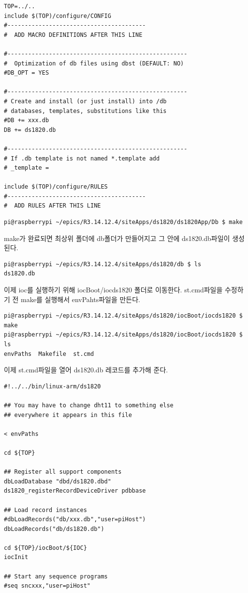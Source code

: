 \documentclass[11pt
  , a4paper
  , article
  , oneside
]{memoir}
\begin{document}
\begin{lstlisting}[style=termstyle]
TOP=../..
include $(TOP)/configure/CONFIG
#----------------------------------------
#  ADD MACRO DEFINITIONS AFTER THIS LINE

#----------------------------------------------------
#  Optimization of db files using dbst (DEFAULT: NO)
#DB_OPT = YES

#----------------------------------------------------
# Create and install (or just install) into /db
# databases, templates, substitutions like this
#DB += xxx.db
DB += ds1820.db

#----------------------------------------------------
# If .db template is not named *.template add
# _template = 

include $(TOP)/configure/RULES
#----------------------------------------
#  ADD RULES AFTER THIS LINE
\end{lstlisting}
\begin{lstlisting}[style=termstyle]
pi@raspberrypi ~/epics/R3.14.12.4/siteApps/ds1820/ds1820App/Db $ make
\end{lstlisting}
make가 완료되면 최상위 폴더에 db폴더가 만들어지고 그 안에 ds1820.db파일이 생성된다.
\begin{lstlisting}[style=termstyle]
pi@raspberrypi ~/epics/R3.14.12.4/siteApps/ds1820/db $ ls
ds1820.db
\end{lstlisting}
이제 ioc를 실행하기 위해 iocBoot/iocds1820 폴더로 이동한다. st.cmd파일을 수정하기 전 make를 실행해서 
envPahts파일을 만든다.
\begin{lstlisting}[style=termstyle]
pi@raspberrypi ~/epics/R3.14.12.4/siteApps/ds1820/iocBoot/iocds1820 $ make
pi@raspberrypi ~/epics/R3.14.12.4/siteApps/ds1820/iocBoot/iocds1820 $ ls
envPaths  Makefile  st.cmd
\end{lstlisting}
이제 st.cmd파일을 열어 ds1820.db 레코드를 추가해 준다.
\begin{lstlisting}[style=termstyle]
#!../../bin/linux-arm/ds1820

## You may have to change dht11 to something else
## everywhere it appears in this file

< envPaths

cd ${TOP}

## Register all support components
dbLoadDatabase "dbd/ds1820.dbd"
ds1820_registerRecordDeviceDriver pdbbase

## Load record instances
#dbLoadRecords("db/xxx.db","user=piHost")
dbLoadRecords("db/ds1820.db")

cd ${TOP}/iocBoot/${IOC}
iocInit

## Start any sequence programs
#seq sncxxx,"user=piHost"
\end{lstlisting}
\end{document}
